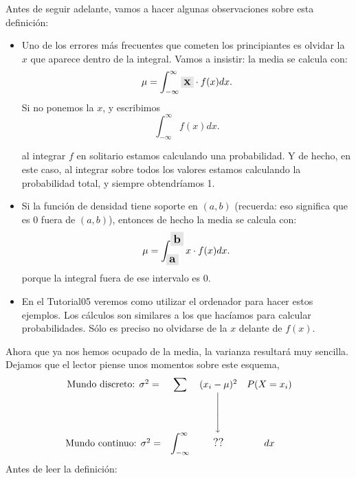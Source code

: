 Antes de seguir adelante, vamos a hacer algunas observaciones sobre esta definición:
\begin{itemize}
  \item Uno de los errores más frecuentes que cometen los principiantes es olvidar la $x$ que aparece dentro de la integral. Vamos a insistir: la media se calcula con:
           \[
           \mu=\int_{-\infty}^{\infty} \colorbox{lightgrey}{\large$\mathbf x$}\cdot f(x)dx.
           \]
      Si no ponemos la $x$, y escribimos
           \[
           \int_{-\infty}^{\infty} f(x)dx.
           \]

      al integrar $f$ en solitario estamos calculando una probabilidad. Y de hecho, en este caso, al integrar sobre todos los valores estamos calculando la probabilidad total, y siempre obtendríamos 1.

  \item Si la función de densidad tiene soporte en $(a,b)$ (recuerda: eso significa que es $0$ fuera de $(a,b)$), entonces de hecho la media se calcula con:
           \[
           \mu=\int_{\colorbox{lightgrey}{\large$\mathbf a$}}^{\colorbox{lightgrey}{\large$\mathbf b$}} x\cdot f(x)dx.
           \]
      porque la integral fuera de ese intervalo es $0$.
  \item En el Tutorial05 veremos como utilizar el ordenador para hacer estos ejemplos. Los cálculos son similares a los que hacíamos para calcular probabilidades. Sólo es preciso no olvidarse de la $x$ delante de $f(x)$.
\end{itemize}
Ahora que ya nos hemos ocupado de la media, la varianza resultará muy sencilla. Dejamos que el lector piense unos momentos sobre este esquema,
\begin{equation}\label{cap05:ecu:EsquemaVarianzaDiscretoAContinuo}
\begin{array}{ccccc}
\mbox{Mundo discreto: }\sigma^2=&\displaystyle\sum& (x_i-\mu)^2& P(X=x_i)\\
&&\left\downarrow\rule{0cm}{0.8cm}\right.&\\[5mm]
\mbox{Mundo continuo: }\sigma^2=&\displaystyle\int_{-\infty}^{\infty}&
\mbox{\large ??}&dx
\end{array}
\end{equation}
Antes de leer la definición:

